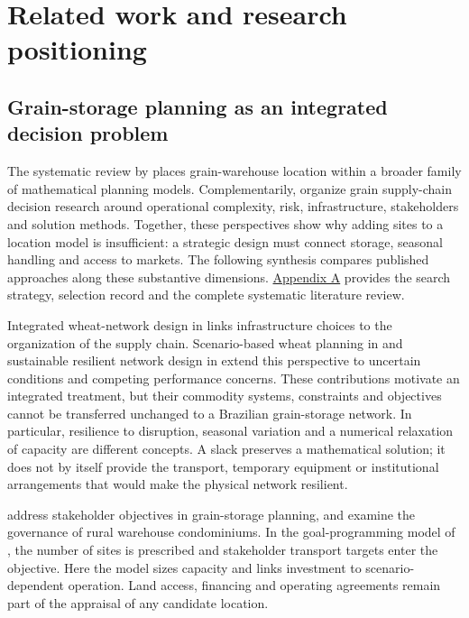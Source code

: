 \documentclass[
  english,
  11pt,
  a4paper,
  authoryear,
  preprint]{elsarticle}
\begin{document}
\section{Related work and research
positioning}\label{related-work-and-research-positioning}

\subsection{Grain-storage planning as an integrated decision
problem}\label{grain-storage-planning-as-an-integrated-decision-problem}

The systematic review by \citet{rosa2025} places grain-warehouse
location within a broader family of mathematical planning models.
Complementarily, \citet{garima2024} organize grain supply-chain decision
research around operational complexity, risk, infrastructure,
stakeholders and solution methods. Together, these perspectives show why
adding sites to a location model is insufficient: a strategic design
must connect storage, seasonal handling and access to markets. The
following synthesis compares published approaches along these
substantive dimensions.
\href{https://unb-lamfo-or-ai-hpc.github.io/model-agrologistic/supplementary-review.html}{Appendix
A} provides the search strategy, selection record and the complete systematic literature review.

Integrated wheat-network design in \citet{gholamian2017} links
infrastructure choices to the organization of the supply chain.
Scenario-based wheat planning in \citet{pourmohammadi2020} and
sustainable resilient network design in \citet{hosseini2020} extend
this perspective to uncertain conditions and competing performance
concerns. These contributions motivate an integrated treatment, but
their commodity systems, constraints and objectives cannot be
transferred unchanged to a Brazilian grain-storage network. In
particular, resilience to disruption, seasonal variation and a numerical
relaxation of capacity are different concepts. A slack preserves a
mathematical solution; it does not by itself provide the transport,
temporary equipment or institutional arrangements that would make the
physical network resilient.

\citet{essien2018} address stakeholder objectives in grain-storage
planning, and \citet{filippi2022} examine the governance of rural
warehouse condominiums. In the goal-programming model of
\citet{essien2018}, the number of sites is prescribed and stakeholder
transport targets enter the objective. Here the model sizes capacity and
links investment to scenario-dependent operation. Land access, financing
and operating agreements remain part of the appraisal of any candidate
location.
\end{document}

